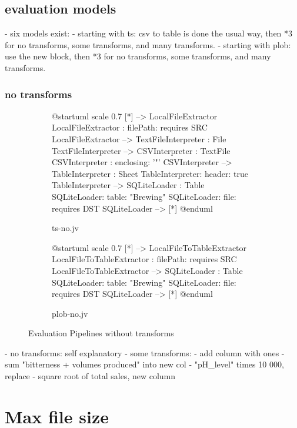 \subsection{evaluation models}
- six models exist:
- starting with ts: csv to table is done the usual way, then  *3 for no transforms, some transforms, and many transforms.
- starting with plob: use the new block, then  *3 for no transforms, some transforms, and many transforms.

\subsubsection{no transforms}
\begin{figure}
	\begin{subfigure}[h]{0.4\linewidth}
		\begin{plantuml}
			@startuml
			scale 0.7
				[*] --> LocalFileExtractor
			LocalFileExtractor : filePath: requires SRC
			LocalFileExtractor --> TextFileInterpreter : File
			TextFileInterpreter --> CSVInterpreter : TextFile
			CSVInterpreter : enclosing: '"'
			CSVInterpreter --> TableInterpreter : Sheet
			TableInterpreter: header: true
			TableInterpreter --> SQLiteLoader : Table
			SQLiteLoader: table: "Brewing"
			SQLiteLoader: file: requires DST
			SQLiteLoader --> [*]
			@enduml
		\end{plantuml}
		\caption{ts-no.jv}
	\end{subfigure}
	\hfill
	\begin{subfigure}[h]{0.4\linewidth}
		\begin{plantuml}
			@startuml
			scale 0.7
				[*] --> LocalFileToTableExtractor
			LocalFileToTableExtractor : filePath: requires SRC
			LocalFileToTableExtractor --> SQLiteLoader : Table
			SQLiteLoader: table: "Brewing"
			SQLiteLoader: file: requires DST
			SQLiteLoader --> [*]
			@enduml
		\end{plantuml}
		\caption{plob-no.jv}
	\end{subfigure}
	\caption{Evaluation Pipelines without transforms}
\end{figure}

- no transforms: self explanatory
- some transforms:
- add column with ones
- sum "bitterness + volumes produced" into new col
-  "pH\_level" times 10 000, replace
- square root of total sales, new column


\section{Max file size}
